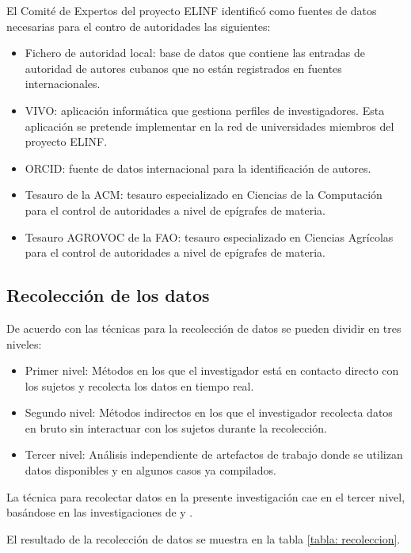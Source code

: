 El Comité de Expertos del proyecto ELINF identificó como fuentes de datos necesarias para el contro de autoridades las siguientes:

\begin{itemize}
\item Fichero de autoridad local: base de datos que contiene las entradas de autoridad de autores cubanos que no están registrados en fuentes internacionales.
\item VIVO: aplicación informática que gestiona perfiles de investigadores. Esta aplicación se pretende implementar en la red de universidades miembros del proyecto ELINF.
\item ORCID: fuente de datos internacional para la identificación de autores.
\item Tesauro de la ACM: tesauro especializado en Ciencias de la Computación para el control de autoridades a nivel de epígrafes de materia.
\item Tesauro AGROVOC de la FAO: tesauro especializado en Ciencias Agrícolas para el control de autoridades a nivel de epígrafes de materia.
\end{itemize}

\subsection{Recolección de los datos}

De acuerdo con \cite{Lethbridge2005} las técnicas para la recolección de datos se pueden dividir en tres niveles:

\begin{itemize}
\item Primer nivel: Métodos en los que el investigador está en contacto directo con los sujetos y recolecta los datos en tiempo real. 
\item Segundo nivel: Métodos indirectos en los que el investigador recolecta datos en bruto sin interactuar con los sujetos durante la recolección.
\item Tercer nivel: Análisis independiente de artefactos de trabajo donde se utilizan datos disponibles y en algunos casos ya compilados.
\end{itemize}

La técnica para recolectar datos en la presente investigación cae en el tercer nivel, basándose en las investigaciones de \cite{Calzadilla-Reyes2015} y \cite{Gonzalez-Barroso2016}.

El resultado de la recolección de datos se muestra en la tabla \ref{tabla: recoleccion}.

